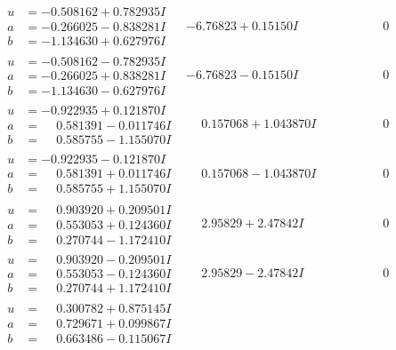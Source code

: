 \documentclass[1p]{elsarticle_modified}
\theoremstyle{definition}
\begin{document}
$$\begin{array}{c|c|c}
\begin{aligned}
u &= -0.508162 + 0.782935 I \\
a &= -0.266025 - 0.838281 I \\
b &= -1.134630 + 0.627976 I\end{aligned}
 & -6.76823 + 0.15150 I & \phantom{-0.000000 } 0 \\ \hline\begin{aligned}
u &= -0.508162 - 0.782935 I \\
a &= -0.266025 + 0.838281 I \\
b &= -1.134630 - 0.627976 I\end{aligned}
 & -6.76823 - 0.15150 I & \phantom{-0.000000 } 0 \\ \hline\begin{aligned}
u &= -0.922935 + 0.121870 I \\
a &= \phantom{-}0.581391 - 0.011746 I \\
b &= \phantom{-}0.585755 - 1.155070 I\end{aligned}
 & \phantom{-}0.157068 + 1.043870 I & \phantom{-0.000000 } 0 \\ \hline\begin{aligned}
u &= -0.922935 - 0.121870 I \\
a &= \phantom{-}0.581391 + 0.011746 I \\
b &= \phantom{-}0.585755 + 1.155070 I\end{aligned}
 & \phantom{-}0.157068 - 1.043870 I & \phantom{-0.000000 } 0 \\ \hline\begin{aligned}
u &= \phantom{-}0.903920 + 0.209501 I \\
a &= \phantom{-}0.553053 + 0.124360 I \\
b &= \phantom{-}0.270744 - 1.172410 I\end{aligned}
 & \phantom{-}2.95829 + 2.47842 I & \phantom{-0.000000 } 0 \\ \hline\begin{aligned}
u &= \phantom{-}0.903920 - 0.209501 I \\
a &= \phantom{-}0.553053 - 0.124360 I \\
b &= \phantom{-}0.270744 + 1.172410 I\end{aligned}
 & \phantom{-}2.95829 - 2.47842 I & \phantom{-0.000000 } 0 \\ \hline\begin{aligned}
u &= \phantom{-}0.300782 + 0.875145 I \\
a &= \phantom{-}0.729671 + 0.099867 I \\
b &= \phantom{-}0.663486 - 0.115067 I\end{aligned}

\end{array}$$
\end{document}
